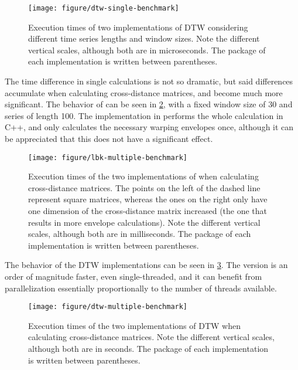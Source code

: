 \begin{figure}[htbp]

	{\centering \texttt{[image: figure/dtw-single-benchmark]}

	}

	\caption{Execution times of two implementations of DTW considering different time series lengths and window sizes. Note the different vertical scales, although both are in microseconds. The package of each implementation is written between parentheses.}\label{fig:dtw-single-benchmark}
\end{figure}

The time difference in single calculations is not so dramatic,
but said differences accumulate when calculating cross-distance matrices,
and become much more significant.
The behavior of  can be seen in \cref{fig:lbk-multiple-benchmark},
with a fixed window size of 30 and series of length 100.
The implementation in \dtwclust{} performs the whole calculation in C++,
and only calculates the necessary warping envelopes once,
although it can be appreciated that this does not have a significant effect.

\begin{figure}[htbp]

	{\centering \texttt{[image: figure/lbk-multiple-benchmark]}
	}

	\caption{Execution times of the two implementations of  when calculating cross-distance matrices. The points on the left of the dashed line represent square matrices, whereas the ones on the right only have one dimension of the cross-distance matrix increased (the one that results in more envelope calculations). Note the different vertical scales, although both are in milliseconds. The package of each implementation is written between parentheses.}\label{fig:lbk-multiple-benchmark}
\end{figure}

The behavior of the DTW implementations can be seen in \cref{fig:dtw-multiple-benchmark}.
The \dtwclust{} version is an order of magnitude faster,
even single-threaded,
and it can benefit from parallelization essentially proportionally to the number of threads available.

\begin{figure}[htbp]

	{\centering \texttt{[image: figure/dtw-multiple-benchmark]}

	}

	\caption{Execution times of the two implementations of DTW when calculating cross-distance matrices. Note the different vertical scales, although both are in seconds. The package of each implementation is written between parentheses.}\label{fig:dtw-multiple-benchmark}
\end{figure}

